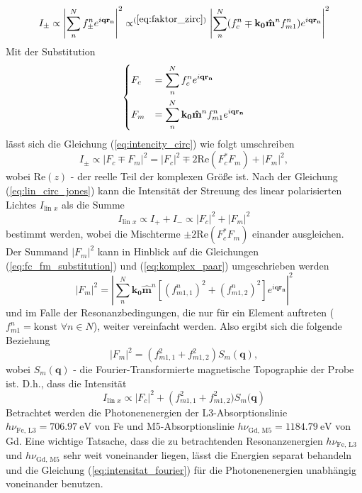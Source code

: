 \begin{equation}
    I_{\pm} \propto \left| \sum_{n}^N f_{\pm}^n e^{i\mathbf{qr_n}} \right|^2 \propto^{(\ref{eq:faktor_zirc})} \left| \sum_{n}^N (f_{c}^n\mp \mathbf{k_0}\mathbf{\hat{m}}^n f_{m1}^n) e^{i\mathbf{qr_n}} \right|^2
    \label{eq:intencity_circ}
\end{equation}
Mit der Substitution
\begin{equation}
    \begin{dcases}
     F_c &= \sum^N_n f_c^n e^{i\mathbf{qr_n}}\\
     F_m &= \sum^N_n \mathbf{k_0}\mathbf{\hat{m}}^n f_{m1}^n e^{i\mathbf{qr_n}}
    \end{dcases}
    \label{eq:fc_fm_substitution}
\end{equation}
lässt sich die Gleichung (\ref{eq:intencity_circ}) wie folgt umschreiben
\begin{equation}
     I_{\pm} \propto \left| F_c \mp F_m \right|^2 = \left| F_c \right|^2 \mp 2\text{Re}(F_c^*F_m) + \left| F_m \right|^2,
\end{equation}
wobei $\text{Re}(z)$ - der reelle Teil der komplexen Größe ist. Nach der Gleichung (\ref{eq:lin_circ_jones}) kann die Intensität der Streuung des linear polarisierten Lichtes $I_{\text{lin $x$}}$ als die Summe
\begin{equation}
    I_{\text{lin $x$}} \propto I_+ + I_- \propto  \left| F_c \right|^2 + \left| F_m \right|^2
\end{equation}
bestimmt werden, wobei die Mischterme $\pm2\text{Re}(F_c^*F_m)$ einander ausgleichen. Der Summand $\left|F_m\right|^2$ kann in Hinblick auf die Gleichungen (\ref{eq:fc_fm_substitution}) und (\ref{eq:komplex_paar}) umgeschrieben werden
\begin{equation}
    \left|F_m\right|^2 =  \left|\sum^N_n \mathbf{k_0}\mathbf{\hat{m}}^n \left[(f_{m1,1}^n)^2 + (f_{m1,2}^n)^2\right] e^{i\mathbf{qr_n}}\right|^2
\end{equation}
und im Falle der Resonanzbedingungen, die nur für ein Element auftreten ($f_{m1}^n = \text{konst } \forall n \in N$), weiter vereinfacht werden. Also ergibt sich die folgende Beziehung
\begin{equation}
   \left|F_m\right|^2 = (f_{m1,1}^2 + f_{m1,2}^2)S_m(\mathbf{q}),
\end{equation}
wobei $S_m(\mathbf{q})$ - die Fourier-Transformierte magnetische Topographie der Probe ist. D.h., dass die Intensität 
\begin{equation}
    I_{\text{lin $x$}} \propto  \left| F_c \right|^2 + \left(f_{m1,1}^2 + f_{m1,2}^2)S_m(\mathbf{q}\right)
    \label{eq:intensitat_fourier}
\end{equation}
Betrachtet werden die Photonenenergien der L3-Absorptionslinie $h\nu_{\text{Fe, L3}} = \SI{706.97}{\eV}$ von Fe und M5-Absorptionslinie $h\nu_{\text{Gd, M5}} = \SI{1184.79}{\eV}$ von Gd. Eine wichtige Tatsache, dass die zu betrachtenden Resonanzenergien $h\nu_{\text{Fe, L3}}$ und  $h\nu_{\text{Gd, M5}}$ sehr weit voneinander liegen, lässt die Energien separat behandeln und die Gleichung (\ref{eq:intensitat_fourier}) für die Photonenenergien unabhängig voneinander benutzen. 

